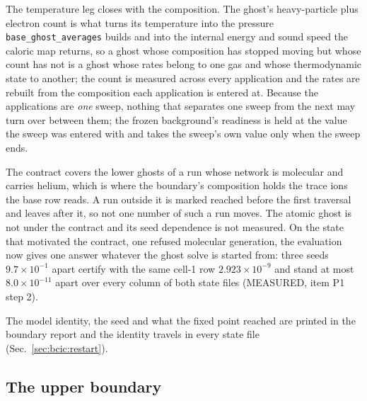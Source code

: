 The temperature leg closes with the composition.  The ghost's heavy-particle
plus electron count is what turns its temperature into the pressure
\texttt{base\_ghost\_averages} builds and into the internal energy and sound
speed the caloric map returns, so a ghost whose composition has stopped
moving but whose count has not is a ghost whose rates belong to one gas and
whose thermodynamic state to another; the count is measured across every
application and the rates are rebuilt from the composition each application
is entered at.  Because the applications are \emph{one} sweep, nothing that
separates one sweep from the next may turn over between them; the frozen
background's readiness is held at the value the sweep was entered with and
takes the sweep's own value only when the sweep ends.

The contract covers the lower ghosts of a run whose network is molecular and
carries helium, which is where the boundary's composition holds the trace
ions the base row reads.  A run outside it is marked reached before the first
traversal and leaves after it, so not one number of such a run moves.  The
atomic ghost is not under the contract and its seed dependence is not
measured.  On the state that motivated the contract, one refused molecular
generation, the evaluation now gives one answer whatever the ghost solve is
started from: three seeds $9.7\times10^{-1}$ apart certify with the same
cell-1 row $2.923\times10^{-9}$ and stand at most $8.0\times10^{-11}$ apart
over every column of both state files (MEASURED, item P1 step 2).

The model identity, the seed and what the fixed point reached are printed in
the boundary report and the identity travels in every state file
(Sec.~\ref{sec:bcic:restart}).


\subsection{The upper boundary}
\label{sec:bcic:top}

